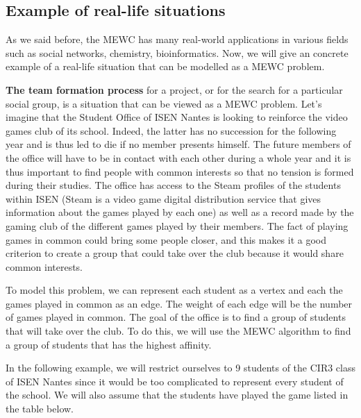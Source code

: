 \subsection{Example of real-life situations}

As we said before, the MEWC has many real-world applications in various fields
such as social networks, chemistry, bioinformatics. Now, we will give an concrete
example of a real-life situation that can be modelled as a MEWC problem. \newline

\textbf{The team formation process} for a project, or for the search for a particular
social group, is a situation that can be viewed as a MEWC problem. Let's imagine that
the Student Office of ISEN Nantes is looking to reinforce the video games club of its
school. Indeed, the latter has no succession for the following year and is thus led to
die if no member presents himself. The future members of the office will have to be
in contact with each other during a whole year and it is thus important to find people
with common interests so that no tension is formed during their studies. The office has
access to the Steam profiles of the students within ISEN (Steam is a video game digital
distribution service that gives information about the games played by each one) as well
as a record made by the gaming club of the different games played by their members. The
fact of playing games in common could bring some people closer, and this makes it a good
criterion to create a group that could take over the club because it would share common
interests. \newline

To model this problem, we can represent each student as a vertex and each the games
played in common as an edge. The weight of each edge will be the number of games played
in common. The goal of the office is to find a group of students that will take over the
club. To do this, we will use the MEWC algorithm to find a group of students that
has the highest affinity. \newline

In the following example, we will restrict ourselves to 9 students of the CIR3 class
of ISEN Nantes since it would be too complicated to represent every student of the
school. We will also assume that the students have played the game listed in the table
below. \newline

